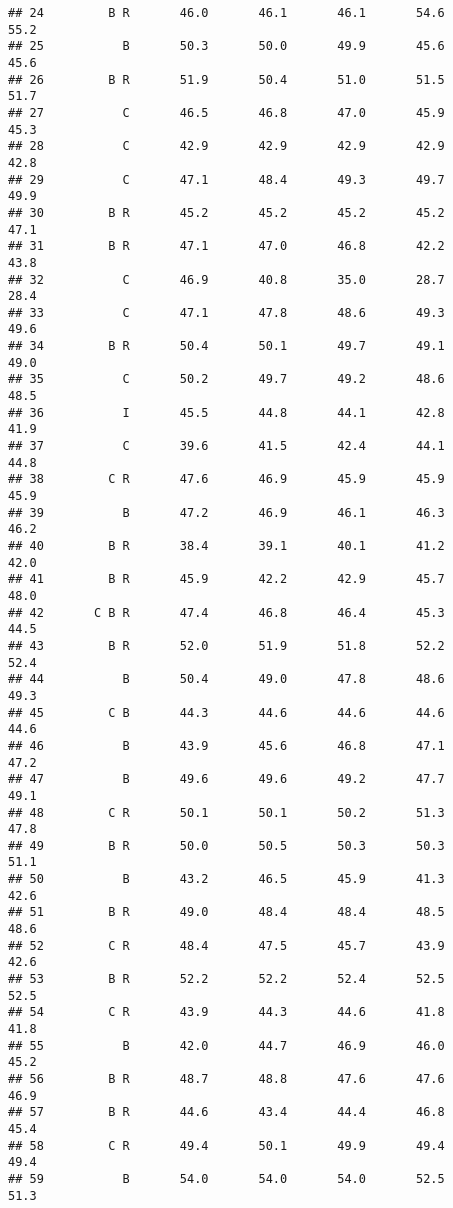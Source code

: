\documentclass[]{article}
\begin{document}
\begin{verbatim}
## 24         B R       46.0       46.1       46.1       54.6       55.2
## 25           B       50.3       50.0       49.9       45.6       45.6
## 26         B R       51.9       50.4       51.0       51.5       51.7
## 27           C       46.5       46.8       47.0       45.9       45.3
## 28           C       42.9       42.9       42.9       42.9       42.8
## 29           C       47.1       48.4       49.3       49.7       49.9
## 30         B R       45.2       45.2       45.2       45.2       47.1
## 31         B R       47.1       47.0       46.8       42.2       43.8
## 32           C       46.9       40.8       35.0       28.7       28.4
## 33           C       47.1       47.8       48.6       49.3       49.6
## 34         B R       50.4       50.1       49.7       49.1       49.0
## 35           C       50.2       49.7       49.2       48.6       48.5
## 36           I       45.5       44.8       44.1       42.8       41.9
## 37           C       39.6       41.5       42.4       44.1       44.8
## 38         C R       47.6       46.9       45.9       45.9       45.9
## 39           B       47.2       46.9       46.1       46.3       46.2
## 40         B R       38.4       39.1       40.1       41.2       42.0
## 41         B R       45.9       42.2       42.9       45.7       48.0
## 42       C B R       47.4       46.8       46.4       45.3       44.5
## 43         B R       52.0       51.9       51.8       52.2       52.4
## 44           B       50.4       49.0       47.8       48.6       49.3
## 45         C B       44.3       44.6       44.6       44.6       44.6
## 46           B       43.9       45.6       46.8       47.1       47.2
## 47           B       49.6       49.6       49.2       47.7       49.1
## 48         C R       50.1       50.1       50.2       51.3       47.8
## 49         B R       50.0       50.5       50.3       50.3       51.1
## 50           B       43.2       46.5       45.9       41.3       42.6
## 51         B R       49.0       48.4       48.4       48.5       48.6
## 52         C R       48.4       47.5       45.7       43.9       42.6
## 53         B R       52.2       52.2       52.4       52.5       52.5
## 54         C R       43.9       44.3       44.6       41.8       41.8
## 55           B       42.0       44.7       46.9       46.0       45.2
## 56         B R       48.7       48.8       47.6       47.6       46.9
## 57         B R       44.6       43.4       44.4       46.8       45.4
## 58         C R       49.4       50.1       49.9       49.4       49.4
## 59           B       54.0       54.0       54.0       52.5       51.3

\end{verbatim}
\end{document}
